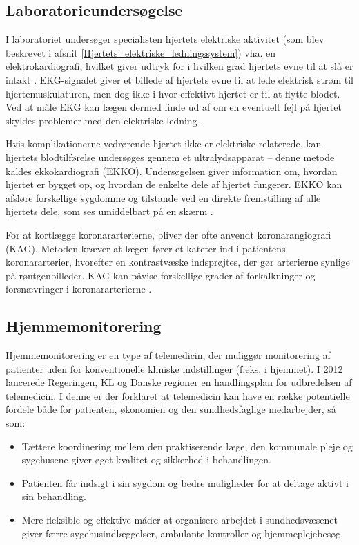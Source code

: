 \subsection{Laboratorieundersøgelse}
I laboratoriet undersøger specialisten hjertets elektriske aktivitet (som blev beskrevet i afsnit \ref{Hjertets_elektriske_ledningssystem}) vha. en elektrokardiografi, hvilket giver udtryk for i hvilken grad hjertets evne til at slå er intakt \cite{ekg}. EKG-signalet giver et billede af hjertets evne til at lede elektrisk strøm til hjertemuskulaturen, men dog ikke i hvor effektivt hjertet er til at flytte blodet. Ved at måle EKG kan lægen dermed finde ud af om en eventuelt fejl på hjertet skyldes problemer med den elektriske ledning \cite{ekg}.
 
Hvis komplikationerne vedrørende hjertet ikke er elektriske relaterede, kan hjertets blodtilførelse undersøges gennem et ultralydsapparat – denne metode kaldes ekkokardiografi (EKKO). Undersøgelsen giver information om, hvordan hjertet er bygget op, og hvordan de enkelte dele af hjertet fungerer. EKKO kan afsløre forskellige sygdomme og tilstande ved en direkte fremstilling af alle hjertets dele, som ses umiddelbart på en skærm \cite{hjerud}.
 
For at kortlægge koronararterierne, bliver der ofte anvendt koronarangiografi (KAG). Metoden kræver at lægen fører et kateter ind i patientens koronararterier, hvorefter en kontrastvæske indsprøjtes, der gør arterierne synlige på røntgenbilleder. KAG kan påvise forskellige grader af forkalkninger og forsnævringer i koronararterierne \cite{hjerud}. 
 
\subsection{Hjemmemonitorering}
Hjemmemonitorering er en type af telemedicin, der muliggør monitorering af patienter uden for konventionelle kliniske indstillinger (f.eks. i hjemmet). I 2012 lancerede Regeringen, KL og Danske regioner en handlingsplan for udbredelsen af telemedicin. I denne er der forklaret at telemedicin kan have en række potentielle fordele både for patienten, økonomien og den sundhedsfaglige medarbejder, så som:
\begin{itemize}
\item Tættere koordinering mellem den praktiserende læge, den kommunale pleje og sygehusene giver øget kvalitet og sikkerhed i behandlingen.
\item Patienten får indsigt i sin sygdom og bedre muligheder for at deltage aktivt i sin behandling.
\item Mere fleksible og effektive måder at organisere arbejdet i sundhedsvæsenet giver færre sygehusindlæggelser, ambulante kontroller og hjemmeplejebesøg.
\end{itemize}
 

